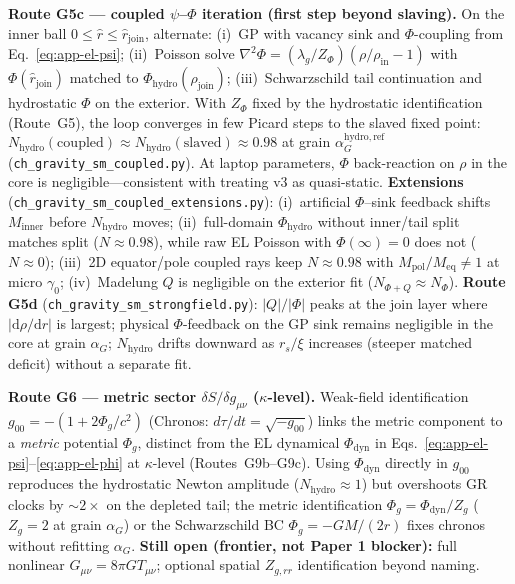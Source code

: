 \documentclass[11pt,a4paper]{article}
\begin{document}
\textbf{Route G5c --- coupled $\psi$--$\Phi$ iteration (first step beyond slaving).}
On the inner ball $0 \le \hat r \le \hat r_{\mathrm{join}}$, alternate:
(i)~GP with vacancy sink and $\Phi$-coupling from Eq.~\ref{eq:app-el-psi};
(ii)~Poisson solve $\nabla^2\Phi = (\lambda_g/Z_\Phi)(\rho/\rho_{\mathrm{in}}-1)$ with $\Phi(\hat r_{\mathrm{join}})$ matched to $\Phi_{\mathrm{hydro}}(\rho_{\mathrm{join}})$;
(iii)~Schwarzschild tail continuation and hydrostatic $\Phi$ on the exterior.
With $Z_\Phi$ fixed by the hydrostatic identification (Route~G5), the loop converges in few Picard steps to the slaved fixed point: $N_{\mathrm{hydro}}(\mathrm{coupled}) \approx N_{\mathrm{hydro}}(\mathrm{slaved}) \approx 0.98$ at grain $\alpha_G^{\mathrm{hydro,ref}}$ (\texttt{ch\_gravity\_sm\_coupled.py}).
At laptop parameters, $\Phi$ back-reaction on $\rho$ in the core is negligible---consistent with treating v3 as quasi-static.
\textbf{Extensions} (\texttt{ch\_gravity\_sm\_coupled\_extensions.py}): (i)~artificial $\Phi$--sink feedback shifts $M_{\mathrm{inner}}$ before $N_{\mathrm{hydro}}$ moves; (ii)~full-domain $\Phi_{\mathrm{hydro}}$ without inner/tail split matches split ($N \approx 0.98$), while raw EL Poisson with $\Phi(\infty)=0$ does not ($N \approx 0$); (iii)~2D equator/pole coupled rays keep $N \approx 0.98$ with $M_{\mathrm{pol}}/M_{\mathrm{eq}} \neq 1$ at micro $\gamma_0$; (iv)~Madelung $Q$ is negligible on the exterior fit ($N_{\Phi+Q} \approx N_\Phi$).
\textbf{Route G5d} (\texttt{ch\_gravity\_sm\_strongfield.py}): $|Q|/|\Phi|$ peaks at the join layer where $|\mathrm{d}\rho/\mathrm{d}r|$ is largest; physical $\Phi$-feedback on the GP sink remains negligible in the core at grain $\alpha_G$; $N_{\mathrm{hydro}}$ drifts downward as $r_s/\xi$ increases (steeper matched deficit) without a separate fit.

\textbf{Route G6 --- metric sector $\delta S/\delta g_{\mu\nu}$ ($\kappa$-level).}
Weak-field identification $g_{00} = -(1 + 2\Phi_g/c^2)$ (Chronos: $d\tau/dt = \sqrt{-g_{00}}$) links the metric component to a \emph{metric} potential $\Phi_g$, distinct from the EL dynamical $\Phi_{\mathrm{dyn}}$ in Eqs.~\ref{eq:app-el-psi}--\ref{eq:app-el-phi} at $\kappa$-level (Routes~G9b--G9c).
Using $\Phi_{\mathrm{dyn}}$ directly in $g_{00}$ reproduces the hydrostatic Newton amplitude ($N_{\mathrm{hydro}}\approx 1$) but overshoots GR clocks by $\sim 2\times$ on the depleted tail; the metric identification $\Phi_g=\Phi_{\mathrm{dyn}}/Z_g$ ($Z_g=2$ at grain $\alpha_G$) or the Schwarzschild BC $\Phi_g=-GM/(2r)$ fixes chronos without refitting $\alpha_G$.
\textbf{Still open (frontier, not Paper 1 blocker):} full nonlinear $G_{\mu\nu}=8\pi G T_{\mu\nu}$; optional spatial $Z_{g,rr}$ identification beyond naming.
\end{document}
